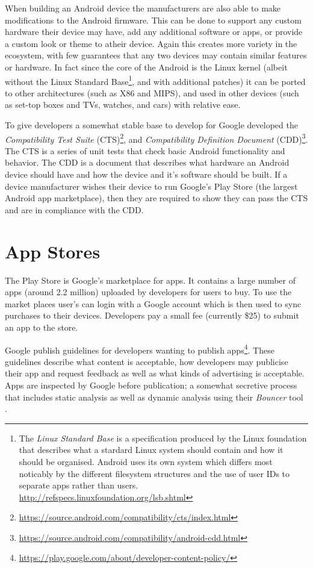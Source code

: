\documentclass[thesis.tex]{subfiles}
\begin{document}
When building an Android device the manufacturers are also able to make
modifications to the Android firmware. This can be done to support any
custom hardware their device may have, add any additional software or
apps, or provide a custom look or theme to atheir device. Again this
creates more variety in the ecosystem, with few guarantees that any two
devices may contain similar features or hardware. In fact since the core
of the Android is the Linux kernel (albeit without the Linux Standard
Base\footnote{The \emph{Linux Standard Base} is a specification produced
  by the Linux foundation that describes what a stardard Linux system
  should contain and how it should be organised. Android uses its own
  system which differs most noticably by the different filesystem
  structures and the use of user IDs to separate apps rather than users.
  \url{http://refspecs.linuxfoundation.org/lsb.shtml}}, and with
additional patches) it can be ported to other architectures (such as X86
and MIPS), and used in other devices (such as set-top boxes and TVs,
watches, and cars) with relative ease.

To give developers a somewhat stable base to develop for Google
developed the \emph{Compatibility Test Suite} (CTS)\footnote{\url{https://source.android.com/compatibility/cts/index.html}},
and \emph{Compatibility Definition Document} (CDD)\footnote{\url{https://source.android.com/compatibility/android-cdd.html}}.
The CTS is a series of unit tests that check basic Android functionality
and behavior. The CDD is a document that describes what hardware an
Android device should have and how the device and it's software should
be built. If a device manufacturer wishes their device to run Google's
Play Store (the largest Android app marketplace), then they are required
to show they can pass the CTS and are in compliance with the CDD.

\section{App Stores}\label{app-stores}

The Play Store is Google's marketplace for apps. It contains a large
number of apps (around 2.2 million) uploaded by developers for users to
buy. To use the market places user's can login with a Google account
which is then used to sync purchases to their devices. Developers pay a
small fee (currently \$25) to submit an app to the store.

Google publish guidelines for developers wanting to publish
apps\footnote{\url{https://play.google.com/about/developer-content-policy/}}.
These guidelines describe what content is acceptable, how developers may
publicise their app and request feedback as well as what kinds of
advertising is acceptable. Apps are inspected by Google before
publication; a somewhat secretive process that includes static analysis
as well as dynamic analysis using their \emph{Bouncer} tool
\cite{oberheide_dissecting_2012}.
\end{document}
